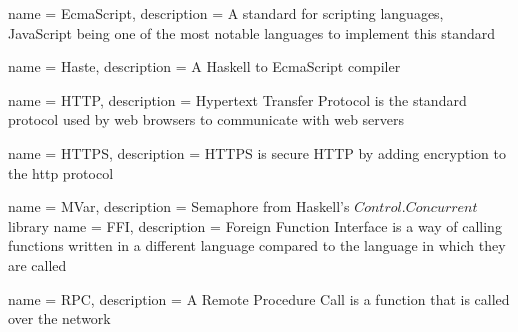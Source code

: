 
{
    name = EcmaScript,
    description = {A standard for scripting languages, JavaScript being one of the most notable languages to implement this standard}
}

{
    name = Haste,
    description = {A Haskell to EcmaScript compiler}
}

{
    name = HTTP,
    description = {Hypertext Transfer Protocol is the standard protocol used by web browsers to communicate with web servers}
}

{
    name = HTTPS,
    description = {HTTPS is secure HTTP by adding encryption to the \gls{http} protocol}
}

{
    name = MVar,
    description = {Semaphore from Haskell's $Control.Concurrent$ library}
}
{
    name = FFI,
    description = {Foreign Function Interface is a way of calling functions written in a different language compared to the language in which they are called}
}

{
    name = RPC,
    description = {A Remote Procedure Call is a function that is called over the network}
}
